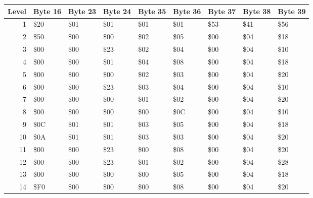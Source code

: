 \begin{figure}[H]
  {
  \setlength{\tabcolsep}{3.0pt}
  \setlength\cmidrulewidth{\heavyrulewidth} %
  \begin{adjustbox}{width=\textwidth}

\begin{tabular}{rllllllll}
\toprule
   Level & Byte 16   & Byte 23   & Byte 24   & Byte 35   & Byte 36   & Byte 37   & Byte 38   & Byte 39   \\
\midrule
       1 & \$20       & \$01       & \$01       & \$01       & \$01       & \$53       & \$41       & \$56       \\
       2 & \$50       & \$00       & \$00       & \$02       & \$05       & \$00       & \$04       & \$18       \\
       3 & \$00       & \$00       & \$23       & \$02       & \$04       & \$00       & \$04       & \$10       \\
       4 & \$00       & \$00       & \$01       & \$04       & \$08       & \$00       & \$04       & \$18       \\
       5 & \$00       & \$00       & \$00       & \$02       & \$03       & \$00       & \$04       & \$20       \\
       6 & \$00       & \$00       & \$23       & \$03       & \$04       & \$00       & \$04       & \$10       \\
       7 & \$00       & \$00       & \$00       & \$01       & \$02       & \$00       & \$04       & \$20       \\
       8 & \$00       & \$00       & \$00       & \$00       & \$0C       & \$00       & \$04       & \$10       \\
       9 & \$0C       & \$01       & \$01       & \$03       & \$05       & \$00       & \$04       & \$18       \\
      10 & \$0A       & \$01       & \$01       & \$03       & \$03       & \$00       & \$04       & \$20       \\
      11 & \$00       & \$00       & \$23       & \$00       & \$08       & \$00       & \$04       & \$20       \\
      12 & \$00       & \$00       & \$23       & \$01       & \$02       & \$00       & \$04       & \$28       \\
      13 & \$00       & \$00       & \$00       & \$00       & \$05       & \$00       & \$04       & \$18       \\
      14 & \$F0       & \$00       & \$00       & \$00       & \$08       & \$00       & \$04       & \$20       \\

\end{tabular}
\end{adjustbox}}
\end{figure}
